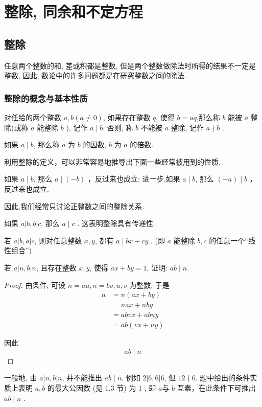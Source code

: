 \chapter{整除, 同余和不定方程}
\section{整除}
任意两个整数的和, 差或积都是整数, 但是两个整数做除法时所得的结果不一定是整数, 因此, 数论中的许多问题都是在研究整数之间的除法.

\subsection{整除的概念与基本性质}
\begin{definition}
对任给的两个整数 $a ,  b(a \neq 0)$, 如果存在整数 $q$, 使得 $b=a q$,那么称 $b$ 能被 $a$ 整除(或称 $a$ 能整除 $b$ ), 记作 $a \mid b$. 否则, 称 $b$ 不能被 $a$ 整除, 记作 $a \nmid b$ . 

如果 $a \mid b$, 那么称 $a$ 为 $b$ 的因数, $b$ 为 $a$ 的倍数.
\end{definition}

利用整除的定义，可以非常容易地推导出下面一些经常被用到的性质. 

\begin{property}
如果 $a \mid b$, 那么 $a \mid(-b)$ ，反过来也成立; 进一步,如果 $a \mid b$, 那么 $(-a) \mid b$ ，反过来也成立.
\end{property}

因此,我们经常只讨论正整数之间的整除关系.

\begin{property}
如果 $a|b, b| c$, 那么 $a \mid c$ . 这表明整除具有传递性.
\end{property}

\begin{property}
若 $a|b, a| c$, 则对任意整数 $x ,  y$, 都有 $a \mid b x+c y$ . (即 $a$ 能整除 $b ,  c$ 的任意一个“线性组合”)
\end{property}

\begin{example}
若 $a|n, b| n$, 且存在整数 $x ,  y$, 使得 $a x+b y=1$, 证明: $a b \mid n$.
\end{example}
\begin{proof}
由条件, 可设 $n=a u, n=b v, u ,  v$ 为整数. 于是\\
\begin{align*}
n & =n(a x+b y) \\
& =n a x+n b y \\
& =a b v x+a b u y \\
& =a b(v x+u y)
\end{align*}

因此
\begin{equation*}
a b \mid n
\end{equation*}
\end{proof}
\begin{note}
一般地, 由 $a|n, b| n$, 并不能推出 $a b \mid n$, 例如 $2|6,6| 6$, 但 $12 \nmid 6$. 题中给出的条件实质上表明 $a ,  b$ 的最大公因数 (见 1.3 节) 为 1 , 即 $a$与 $b$ 互素，在此条件下可推出 $a b \mid n$ . 
\end{note}

